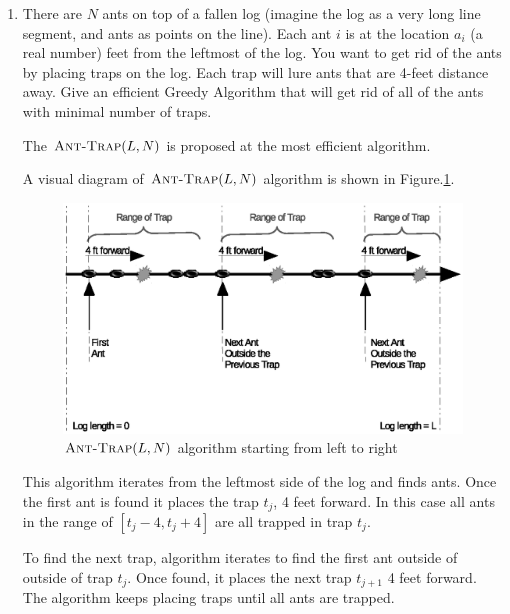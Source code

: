 \documentclass[11pt]{article}
\begin{document}
\begin{enumerate}

\itemsep 0.35in

\item There are $N$ ants on top of a fallen log (imagine the log as a very long line
segment, and ants as points on the line). Each ant $i$ is at the location $a_i$ (a real number) feet from the leftmost of the log. You want to get rid of the ants by placing traps on the log. Each trap will lure ants that are 4-feet distance away. Give an efficient Greedy Algorithm that will get rid of all of the ants with minimal number of traps.

	The $\textnormal{\scshape Ant-Trap}(L,N)$ is proposed at the most efficient algorithm. 

	A visual diagram of $\textnormal{\scshape Ant-Trap}(L,N)$ algorithm is shown in Figure.\ref{fig:ants}.
        
    \begin{figure}[h!]
		\centerline{\includegraphics[width=6in]{ants.eps}}
		\caption{$\textnormal{\scshape Ant-Trap}(L,N)$ algorithm starting from left to right}
		\label{fig:ants}
	\end{figure}

	
	This algorithm iterates from the leftmost side of the log and finds ants. Once the first ant is found it places the trap $t_j$, 4 feet forward. In this case all ants in the range of $[t_j-4, t_j+4]$ are all trapped in trap $t_j$. 
	
	To find the next trap, algorithm iterates to find the first ant outside of outside of trap $t_j$. Once found, it places the next trap $t_{j+1}$ 4 feet forward. The algorithm keeps placing traps until all ants are trapped.
	

	   
		
	\begin{codebox}
		

\end{codebox}
\end{enumerate}
\end{document}
